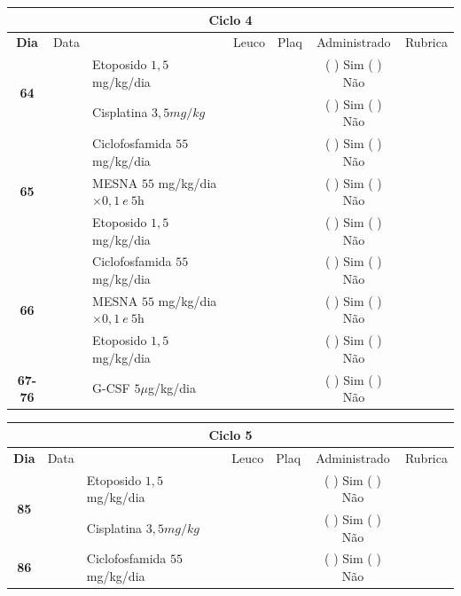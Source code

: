 \documentclass[11pt,a4paper,oldfontcommands]{memoir}
\begin{document}
\begin{center}
\begin{longtable}{p{1cm}c|p{5cm}|p{1.5cm}p{1.5cm}|c|c}
	\hline
	\multicolumn{7}{c}{Ciclo 4} \\
	\hline
	\multicolumn{1}{c|}{\multirow{1}{*}{\textbf{Dia}}}&{Data}&{}&\multicolumn{1}{c|}{Leuco}&\multicolumn{1}{c|}{Plaq}&{Administrado}&{Rubrica} \\
    \hline
    \multicolumn{1}{c|}{\multirow{2}{*}{\textbf{64}}}&&{Etoposido \(1,5\) mg/kg/dia}&\multicolumn{1}{c|}{}&&{(  ) Sim (  ) Não}&\\
    \cline{4-5}
    \multicolumn{1}{c|}{}&\multirow{1}{*}{}&{Cisplatina \(3,5mg/kg\)}&&&{(  ) Sim (  ) Não}&\\
    \hline
    \multicolumn{1}{c|}{\multirow{3}{*}{\textbf{65}}}&&{Ciclofosfamida \(55\) mg/kg/dia}&{}&&{(  ) Sim (  ) Não}&\\
    \multicolumn{1}{c|}{}&&{MESNA \(55\) mg/kg/dia \(\times 0,1 \:e\: 5\)h}&&&{(  ) Sim (  ) Não}&\\
    \multicolumn{1}{c|}{}&&{Etoposido \(1,5\) mg/kg/dia}&&&{(  ) Sim (  ) Não}&\\
    \hline
    \multicolumn{1}{c|}{\multirow{3}{*}{\textbf{66}}}&&{Ciclofosfamida \(55\) mg/kg/dia}&{}&&{(  ) Sim (  ) Não}&\\
    \multicolumn{1}{c|}{}&&{MESNA \(55\) mg/kg/dia \(\times 0,1 \:e\: 5\)h}&&&{(  ) Sim (  ) Não}&\\
    \multicolumn{1}{c|}{}&\multirow{1}{*}{}&{Etoposido \(1,5\) mg/kg/dia}&{}&&{(  ) Sim (  ) Não}&\\
    \hline
    \multicolumn{1}{c|}{\textbf{67-76}}&&{G-CSF \(5 \mu\)g/kg/dia }&&&{(  ) Sim (  ) Não}&\\
    \hline
\end{longtable}
\begin{longtable}{p{1cm}c|p{5cm}|p{1.5cm}p{1.5cm}|c|c}
	\hline
	\multicolumn{7}{c}{Ciclo 5} \\
	\hline
	\multicolumn{1}{c|}{\multirow{1}{*}{\textbf{Dia}}}&{Data}&{}&\multicolumn{1}{c|}{Leuco}&\multicolumn{1}{c|}{Plaq}&{Administrado}&{Rubrica} \\
    \hline
    \multicolumn{1}{c|}{\multirow{2}{*}{\textbf{85}}}&&{Etoposido \(1,5\) mg/kg/dia}&\multicolumn{1}{c|}{}&&{(  ) Sim (  ) Não}&\\
    \cline{4-5}
    \multicolumn{1}{c|}{}&\multirow{1}{*}{}&{Cisplatina \(3,5mg/kg\)}&&&{(  ) Sim (  ) Não}&\\
    \hline
    \multicolumn{1}{c|}{\multirow{3}{*}{\textbf{86}}}&&{Ciclofosfamida \(55\) mg/kg/dia}&{}&&{(  ) Sim (  ) Não}&\\

\end{longtable}
\end{center}
\end{document}
